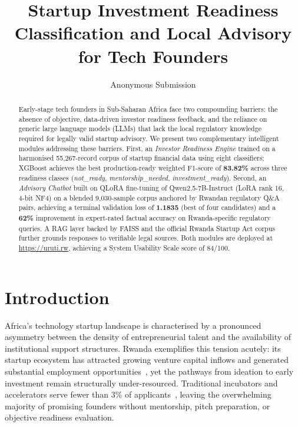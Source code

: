 \documentclass{article}
\title{Startup Investment Readiness Classification and Local Advisory for Tech Founders}
\author{
    Anonymous Submission
}
\begin{document}
\maketitle


\begin{abstract}
Early-stage tech founders in Sub-Saharan Africa face two compounding barriers:
the absence of objective, data-driven investor readiness feedback, and the
reliance on generic large language models (LLMs) that lack the local regulatory
knowledge required for legally valid startup advisory.
We present two complementary intelligent modules addressing these barriers.
First, an \emph{Investor Readiness Engine} trained on a harmonised
55{,}267-record corpus of startup financial data using eight classifiers;
XGBoost achieves the best production-ready weighted F1-score of
\textbf{83.82\%} across three readiness classes (\textit{not\_ready},
\textit{mentorship\_needed}, \textit{investment\_ready}).
Second, an \emph{Advisory Chatbot} built on QLoRA fine-tuning of
Qwen2.5-7B-Instruct (LoRA rank 16, 4-bit NF4) on a blended 9{,}030-sample
corpus anchored by Rwandan regulatory Q\&A pairs, achieving a terminal
validation loss of \textbf{1.1835} (best of four candidates) and a
\textbf{62\%} improvement in expert-rated factual accuracy on Rwanda-specific
regulatory queries.
A RAG layer backed by FAISS and the official Rwanda Startup Act corpus
further grounds responses to verifiable legal sources.
Both modules are deployed at \url{https://uruti.rw}, achieving a
System Usability Scale score of 84/100.
\end{abstract}


\FloatBarrier
\section{Introduction}

Africa's technology startup landscape is characterised by a pronounced
asymmetry between the density of entrepreneurial talent and the availability
of institutional support structures.
Rwanda exemplifies this tension acutely: its startup ecosystem has attracted
growing venture capital inflows and generated substantial employment
opportunities~\citep{partechafrica2024}, yet the pathways from ideation to
early investment remain structurally under-resourced.
Traditional incubators and accelerators serve fewer than 3\% of
applicants~\citep{gem2022africa}, leaving the overwhelming majority of
promising founders without mentorship, pitch preparation, or objective
readiness evaluation.
\end{document}
